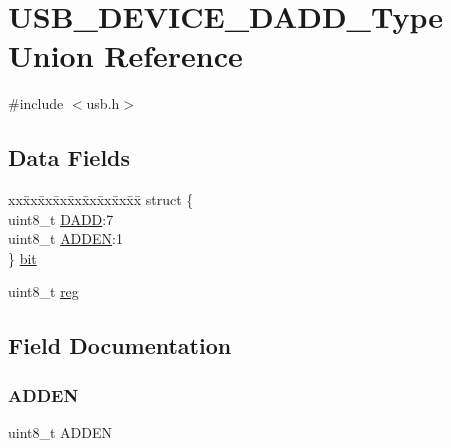 \hypertarget{union_u_s_b___d_e_v_i_c_e___d_a_d_d___type}{}\section{U\+S\+B\+\_\+\+D\+E\+V\+I\+C\+E\+\_\+\+D\+A\+D\+D\+\_\+\+Type Union Reference}
\label{union_u_s_b___d_e_v_i_c_e___d_a_d_d___type}


{\ttfamily \#include $<$usb.\+h$>$}

\subsection*{Data Fields}
\begin{DoxyCompactItemize}
\item 
\begin{tabbing}
xx\=xx\=xx\=xx\=xx\=xx\=xx\=xx\=xx\=\kill
struct \{\\
\>uint8\_t \mbox{\hyperlink{union_u_s_b___d_e_v_i_c_e___d_a_d_d___type_af57daee87bac1512652f8269e6f5d01d}{DADD}}:7\\
\>uint8\_t \mbox{\hyperlink{union_u_s_b___d_e_v_i_c_e___d_a_d_d___type_a835fc8722449961a3a12212a0fa16062}{ADDEN}}:1\\
\} \mbox{\hyperlink{union_u_s_b___d_e_v_i_c_e___d_a_d_d___type_a88125f6241480dbcc78fe7b00d6f7db1}{bit}}\\

\end{tabbing}\item 
uint8\+\_\+t \mbox{\hyperlink{union_u_s_b___d_e_v_i_c_e___d_a_d_d___type_a9428adc9af4653a2050e2536b55dec8d}{reg}}
\end{DoxyCompactItemize}


\subsection{Field Documentation}
\mbox{\label{union_u_s_b___d_e_v_i_c_e___d_a_d_d___type_a835fc8722449961a3a12212a0fa16062}} 
\subsubsection{\texorpdfstring{ADDEN}{ADDEN}}
{\footnotesize\ttfamily uint8\+\_\+t A\+D\+D\+EN}

